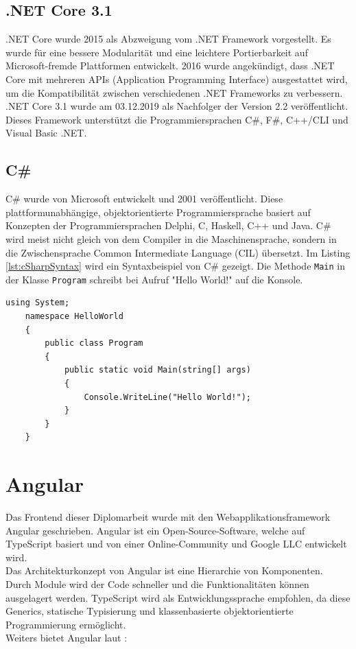 \subsection{.NET Core 3.1}
.NET Core wurde 2015 als Abzweigung vom .NET Framework vorgestellt. Es wurde für eine bessere Modularität und eine leichtere Portierbarkeit auf Microsoft-fremde Plattformen entwickelt. 2016 wurde angekündigt, dass .NET Core mit mehreren APIs (Application Programming Interface) ausgestattet wird, um die Kompatibilität zwischen verschiedenen .NET Frameworks zu verbessern. \autocite{wikiDotnet} \\
.NET Core 3.1 wurde am 03.12.2019 als Nachfolger der Version 2.2 veröffentlicht. Dieses Framework unterstützt die Programmiersprachen C\#, F\#, C++/CLI und Visual Basic .NET. \autocite{wikiDotnetCore}

\subsection{C\#}
C\# wurde von Microsoft entwickelt und 2001 veröffentlicht. Diese plattformunabhängige, objektorientierte Programmiersprache basiert auf Konzepten der Programmiersprachen Delphi, C, Haskell, C++ und Java.
C\# wird meist nicht gleich von dem Compiler in die Maschinensprache, sondern in die Zwischensprache Common Intermediate Language (CIL) übersetzt. Im Listing \ref{lst:cSharpSyntax} wird ein Syntaxbeispiel von C\# gezeigt. Die Methode \texttt{Main} in der Klasse \texttt{Program} schreibt bei Aufruf "Hello World!" auf die Konsole. \autocite{wikiCSharp}

\begin{lstlisting}[caption={C\#-Syntaxbeispiel}, language={[Sharp]C},label={lst:cSharpSyntax}]
	using System;
	namespace HelloWorld
	{
		public class Program
		{
			public static void Main(string[] args)
			{
				Console.WriteLine("Hello World!");
			}
		}
	}
\end{lstlisting}
\section{Angular}
Das Frontend dieser Diplomarbeit wurde mit den Webapplikationsframework Angular geschrieben. Angular ist ein Open-Source-Software, welche auf TypeScript basiert und von einer Online-Community und Google LLC entwickelt wird.\\
Das Architekturkonzept von Angular ist eine Hierarchie von Komponenten. Durch Module wird der Code schneller und die Funktionalitäten können ausgelagert werden. TypeScript wird als Entwicklungssprache empfohlen, da diese Generics, statische Typisierung und klassenbasierte objektorientierte Programmierung ermöglicht. \autocite{wikiAngular}\\
Weiters bietet Angular laut \autocite{wikiAngular}:

